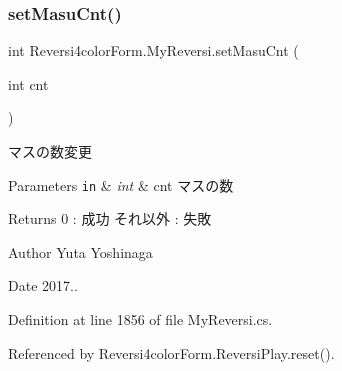 \subsubsection{\texorpdfstring{set\+Masu\+Cnt()}{setMasuCnt()}}
{\footnotesize\ttfamily int Reversi4color\+Form.\+My\+Reversi.\+set\+Masu\+Cnt (\begin{DoxyParamCaption}\item[{int}]{cnt }\end{DoxyParamCaption})}



マスの数変更 


\begin{DoxyParams}[1]{Parameters}
\mbox{\tt in}  & {\em int} & cnt マスの数 \\
\hline
\end{DoxyParams}
\begin{DoxyReturn}{Returns}
0 \+: 成功 それ以外 \+: 失敗 
\end{DoxyReturn}
\begin{DoxyAuthor}{Author}
Yuta Yoshinaga 
\end{DoxyAuthor}
\begin{DoxyDate}{Date}
2017.. 
\end{DoxyDate}


Definition at line 1856 of file My\+Reversi.\+cs.



Referenced by Reversi4color\+Form.\+Reversi\+Play.\+reset().

